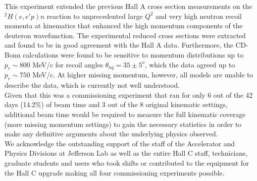 \indent This experiment extended the previous Hall A cross section measurements on the $^{2}H(e,e'p)n$ reaction to 
unprecedented large $Q^{2}$ and very high neutron recoil momenta at kinematics that enhanced the high momentum components of the deuteron wavefunction.
The experimental reduced cross sections were extracted and found to be in good agreement with the Hall A data. Furthermore, the CD-Bonn calculations
were found to be sensitive to momentum distributions up to $p_{r}\sim800$ MeV/c for recoil angles $\theta_{nq}=35\pm5^{o}$, which the data agreed
up to $p_{r}\sim750$ MeV/c. At higher missing momentum, however, all models are unable to describe the data, which is currently not well understood.\\
\indent Given that this was a commissioning experiment that ran for only 6 out of the 42 days (14.2$\%$) of beam time and 3 out of the 8 original kinematic settings,
additional beam time would be required to measure the full kinematic coverage (more missing momentum settings) to gain the necessary statistics 
in order to make any definitive arguments about the underlying physics observed. \\
\indent We acknowledge the outstanding support of the staff of the Accelerator and Physics Divisions at Jefferson Lab
as well as the entire Hall C staff, technicians, graduate students and users who took shifts or contributed
to the equipment for the Hall C upgrade making all four commissioning experiments possible. 

